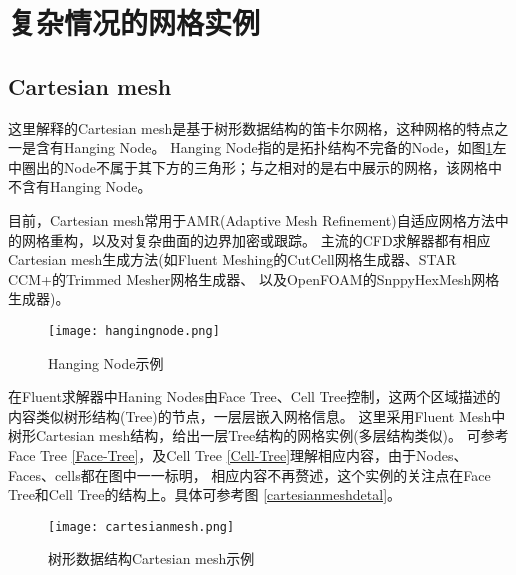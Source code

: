 \documentclass[lang=cn,11pt,a4paper]{elegantpaper} %
\begin{document}
\section{复杂情况的网格实例}

\subsection{Cartesian mesh}\label{Cartesianmesh}

这里解释的Cartesian mesh是基于树形数据结构的笛卡尔网格，这种网格的特点之一是含有Hanging Node。
Hanging Node指的是拓扑结构不完备的Node，如图\ref{hangingnode}左中圈出的Node不属于其下方的三角形；与之相对的是右中展示的网格，该网格中不含有Hanging Node。

目前，Cartesian mesh常用于AMR(Adaptive Mesh Refinement)自适应网格方法中的网格重构，以及对复杂曲面的边界加密或跟踪。
主流的CFD求解器都有相应Cartesian mesh生成方法(如Fluent Meshing的CutCell网格生成器、STAR CCM+的Trimmed Mesher网格生成器、
以及OpenFOAM的SnppyHexMesh网格生成器)。
\begin{figure}[!htb]
  \centering
  \texttt{[image: hangingnode.png]}
  \caption{Hanging Node示例}
  \label{hangingnode}
\end{figure}

在Fluent求解器中Haning Nodes由Face Tree、Cell Tree控制，这两个区域描述的内容类似树形结构(Tree)的节点，一层层嵌入网格信息。
这里采用Fluent Mesh中树形Cartesian mesh结构，给出一层Tree结构的网格实例(多层结构类似)。
可参考Face Tree \ref{Face-Tree}，及Cell Tree \ref{Cell-Tree}理解相应内容，由于Nodes、Faces、cells都在图中一一标明，
相应内容不再赘述，这个实例的关注点在Face Tree和Cell Tree的结构上。具体可参考图 \ref{cartesianmeshdetal}。 
\begin{figure}[!htb]
  \centering
  \texttt{[image: cartesianmesh.png]}
  \caption{树形数据结构Cartesian mesh示例}
  \label{cartesianmeshexample}
\end{figure}
\end{document}
